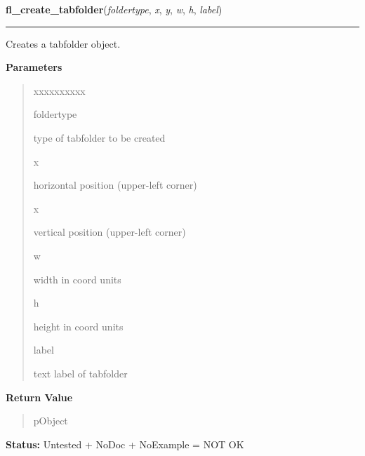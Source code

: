 \hspace{.8\funcindent}\begin{boxedminipage}{\funcwidth}

    \raggedright \textbf{fl\_create\_tabfolder}(\textit{foldertype}, \textit{x}, \textit{y}, \textit{w}, \textit{h}, \textit{label})

    \vspace{-1.5ex}

    \rule{\textwidth}{0.5\fboxrule}
\setlength{\parskip}{2ex}
    Creates a tabfolder object.

\setlength{\parskip}{1ex}
      \textbf{Parameters}
      \vspace{-1ex}

      \begin{quote}
        \begin{Ventry}{xxxxxxxxxx}

          \item[foldertype]

          type of tabfolder to be created

          \item[x]

          horizontal position (upper-left corner)

          \item[x]

          vertical position (upper-left corner)

          \item[w]

          width in coord units

          \item[h]

          height in coord units

          \item[label]

          text label of tabfolder

        \end{Ventry}

      \end{quote}

      \textbf{Return Value}
    \vspace{-1ex}

      \begin{quote}
      pObject

      \end{quote}

\textbf{Status:} Untested + NoDoc + NoExample = NOT OK



    \end{boxedminipage}

